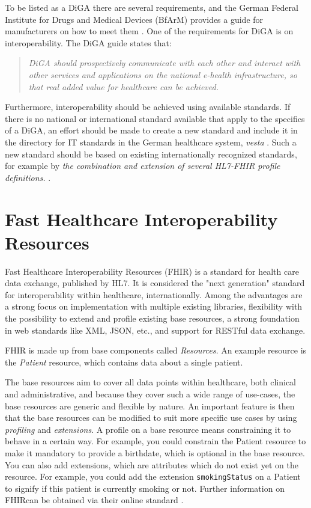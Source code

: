 \documentclass{report}
\def\code#1{\texttt{#1}} %
\newcommand{\fhir}{FHIR\textsuperscript{\textregistered}}
\newcommand{\hl}{HL7\textsuperscript{\textregistered}}
\begin{document}
To be listed as a DiGA there are several requirements, and the German Federal Institute for Drugs and Medical Devices (BfArM) provides a guide for manufacturers on how to meet them \cite{guide}.
One of the requirements for DiGA is on interoperability. The DiGA guide \cite[p.51]{guide} states that:

\begin{quotation}
    \noindent \textit{DiGA should prospectively communicate with each other and interact with other services and applications on the national e-health infrastructure, so that real added value for healthcare can be achieved.}
\end{quotation}

Furthermore, interoperability should be achieved using available standards. If there is no national or international standard available that apply to the specifics of a DiGA, an effort should be made to create a new standard and include it in the directory for IT standards in the German healthcare system, \textit{vesta} \cite{vesta}.
Such a new standard should be based on existing internationally recognized standards, for example by \textit{the combination and extension of several HL7-FHIR profile definitions.} \cite[p.53-54]{guide}.

\section{Fast Healthcare Interoperability Resources}
Fast Healthcare Interoperability Resources (\fhir) \cite{FHIR} is a standard for health care data exchange, published by \hl. It is considered the "next generation" standard for interoperability within healthcare, internationally.
Among the advantages are a strong focus on implementation with multiple existing libraries, flexibility with the possibility to extend and profile existing base resources, a strong foundation in web standards like XML, JSON, etc., and support for RESTful data exchange.

FHIR is made up from base components called \textit{Resources}. An example resource is the \textit{Patient} resource, which contains data about a single patient. 

The base resources aim to cover all data points within healthcare, both clinical and administrative, and because they cover such a wide range of use-cases, the base resources are generic and flexible by nature.
An important feature is then that the base resources can be modified to suit more specific use cases by using \textit{profiling} and \textit{extensions}. A profile on a base resource means constraining it to behave in a certain way.
For example, you could constrain the Patient resource to make it mandatory to provide a birthdate, which is optional in the base resource. You can also add extensions, which are attributes which do not exist yet on the resource. For example, you could
add the extension \code{smokingStatus} on a Patient to signify if this patient is currently smoking or not. Further information on \fhir can be obtained via their online standard \cite{FHIR}.
\end{document}

